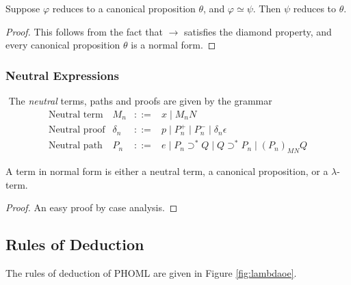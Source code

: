 \documentclass[a4paper,UKenglish]{lipics-v2016}
\theoremstyle{plain}
\theoremstyle{definition}
\begin{document}
\begin{lemma}
\label{lm:compat-beta}
Suppose $\varphi$ reduces to a canonical proposition $\theta$, and $\varphi \simeq \psi$.  Then $\psi$ reduces to $\theta$.
\end{lemma}

\begin{proof}
This follows from the fact that $\rightarrow$ satisfies the diamond property, and every canonical proposition $\theta$ is a normal form.
\end{proof}

\subsubsection{Neutral Expressions}

\begin{definition}[Neutral]$ $
The \emph{neutral} terms, paths and proofs are given by the grammar
\[ \begin{array}{lrcl}
\text{Neutral term} & M_n & ::= & x \mid M_n N \\
\text{Neutral proof} & \delta_n & ::= & p \mid P_n^+ \mid P_n^- \mid \delta_n \epsilon \\
\text{Neutral path} & P_n & ::= & e \mid P_n \supset^* Q \mid Q \supset^* P_n \mid (P_n)_{MN} Q
\end{array} \]
\end{definition}

\begin{lemma}
A term in normal form is either a neutral term, a canonical proposition, or a $\lambda$-term.
\end{lemma}

\begin{proof}
An easy proof by case analysis.
\end{proof}

\subsection{Rules of Deduction}

The rules of deduction of PHOML are given in Figure \ref{fig:lambdaoe}.
\end{document}
